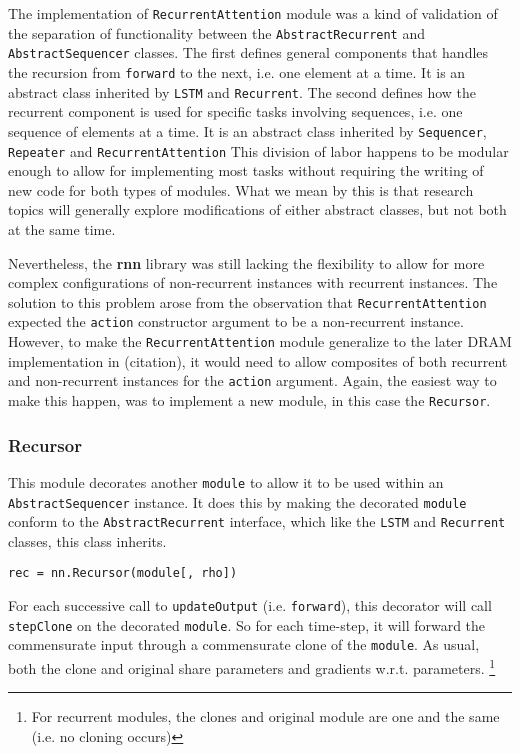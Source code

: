 \documentclass{article} %
\providecommand{\inlinecode}[1]{\texttt{#1}}
\begin{document}
The implementation of \inlinecode{RecurrentAttention} module was a kind of validation of the
separation of functionality between the \inlinecode{AbstractRecurrent} and \inlinecode{AbstractSequencer} classes.
The first defines general components that handles the recursion from \inlinecode{forward} to the next, i.e. one element at a time.
It is an abstract class inherited by \inlinecode{LSTM} and \inlinecode{Recurrent}.
The second defines how the recurrent component is used for specific tasks involving sequences, i.e. one sequence of elements at a time.
It is an abstract class inherited by \inlinecode{Sequencer}, \inlinecode{Repeater} and \inlinecode{RecurrentAttention}
This division of labor happens to be modular enough to allow for implementing most tasks 
without requiring the writing of new code for both types of modules. What we mean by this is that 
research topics will generally explore modifications of either abstract classes, but not both at the same time.

Nevertheless, the \textbf{rnn} library was still lacking the flexibility
to allow for more complex configurations of non-recurrent instances with recurrent instances.
The solution to this problem arose from the observation that \inlinecode{RecurrentAttention} 
expected the \inlinecode{action} constructor argument to be a non-recurrent instance. 
However, to make the \inlinecode{RecurrentAttention} module 
generalize to the later DRAM implementation in (citation), it would need to allow 
composites of both recurrent and non-recurrent instances for the \inlinecode{action} argument. 
Again, the easiest way to make this happen, was to 
implement a new module, in this case the \inlinecode{Recursor}.

\subsubsection{Recursor}
This module decorates another \inlinecode{module} to allow it to be used within an \inlinecode{AbstractSequencer} instance. 
It does this by making the decorated \inlinecode{module} conform to the \inlinecode{AbstractRecurrent} interface, 
which like the \inlinecode{LSTM} and \inlinecode{Recurrent} classes, this class inherits.

\begin{verbatim}
rec = nn.Recursor(module[, rho])
\end{verbatim}

For each successive call to \inlinecode{updateOutput} (i.e. \inlinecode{forward}), 
this decorator will call \inlinecode{stepClone} on the decorated \inlinecode{module}. 
So for each time-step, it will forward the commensurate input through a commensurate clone of the \inlinecode{module}. 
As usual, both the clone and original share parameters and gradients w.r.t. parameters.
\footnote{For recurrent modules, the clones and original module are one and the same (i.e. no cloning occurs)}
\end{document}

